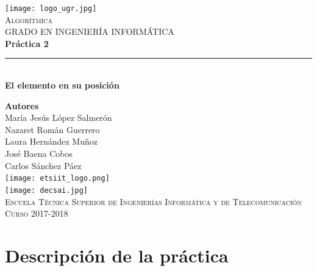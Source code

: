 \documentclass[12pt,spanish]{article}
\begin{document}
\begin{titlepage}

\newlength{\centeroffset}
\setlength{\centeroffset}{-0.5\oddsidemargin}
\addtolength{\centeroffset}{0.5\evensidemargin}
\thispagestyle{empty}

\noindent\hspace*{\centeroffset}
\begin{minipage}{\textwidth}

\centering
\texttt{[image: logo\_ugr.jpg]}\\[1.4cm]

\textsc{ \Large Algorítmica\\[0.2cm]}
\textsc{GRADO EN INGENIERÍA INFORMÁTICA}\\[1cm]

{\Huge\bfseries Práctica 2\\}
\noindent\rule[-1ex]{\textwidth}{3pt}\\[3.5ex]
{\large\bfseries El elemento en su posición}
\end{minipage}

\vspace{1.5cm}
\noindent\hspace*{\centeroffset}
\begin{minipage}{\textwidth}
\centering

\textbf{Autores}\\ {María Jesús López Salmerón \\ Nazaret Román Guerrero \\ Laura Hernández Muñoz \\ José Baena Cobos  \\ Carlos Sánchez Páez}\\[2.5ex]
\texttt{[image: etsiit\_logo.png]}\\[0.1cm]
\vspace{1.5cm}
\texttt{[image: decsai.jpg]}\\[0.1cm]
\vspace{1cm}
\textsc{Escuela Técnica Superior de Ingenierías Informática y de Telecomunicación}\\
\vspace{1cm}
\textsc{Curso 2017-2018}
\end{minipage}
\end{titlepage}
\tableofcontents
\thispagestyle{empty}
\listoftables
\listoffigures
\newpage
\setcounter{page}{1}
\section{Descripción de la práctica}
\end{document}
